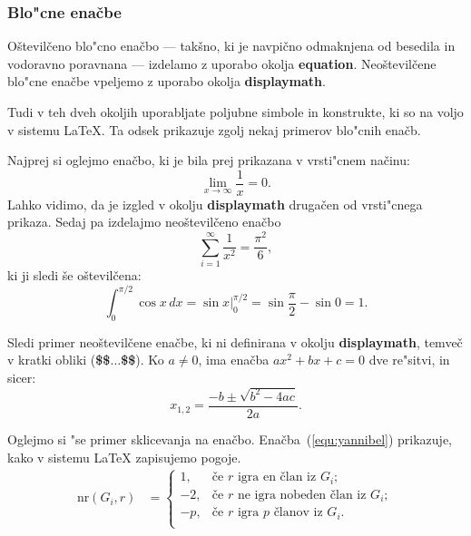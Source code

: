 \documentclass[sigconf]{acmart}
\begin{document}
\subsubsection{Blo"cne enačbe}

Oštevilčeno blo"cno enačbo --- takšno, ki je navpično odmaknjena od besedila
in vodoravno poravnana --- izdelamo z uporabo okolja \textbf{equation}.
Neoštevilčene blo"cne enačbe vpeljemo z uporabo okolja \textbf{displaymath}.

Tudi v teh dveh okoljih uporabljate poljubne simbole in konstrukte, ki so na
voljo v sistemu \LaTeX. Ta odsek prikazuje zgolj nekaj primerov blo"cnih
enačb.

Najprej si oglejmo enačbo, ki je bila prej prikazana v vrsti"cnem načinu: 
%
\begin{equation}
\lim_{x\rightarrow \infty}\frac{1}{x}=0.
\end{equation}
%
Lahko vidimo, da je izgled v okolju \textbf{displaymath} drugačen od vrsti"cnega
prikaza.  Sedaj pa izdelajmo neoštevilčeno enačbo
%
\begin{displaymath}
    \sum_{i=1}^{\infty} \frac{1}{x^2} = \frac{\pi^2}{6},
\end{displaymath}
%
ki ji sledi še oštevilčena:
%
\begin{equation}
    \int_{0}^{\pi/2} \cos x\,dx = \sin x\bigg\rvert_{0}^{\pi/2} = \sin
    \frac{\pi}{2} - \sin 0 = 1.
\end{equation}

Sledi primer neoštevilčene enačbe, ki ni definirana v okolju
\textbf{displaymath}, temveč v kratki obliki (\textbf{\$\$$\ldots$\$\$}).  Ko $a
\ne 0$, ima enačba $ax^2 + bx + c = 0$ dve re"sitvi, in sicer:
%
$$x_{1, 2} = \frac{-b \pm \sqrt{b^2-4ac}}{2a}.$$

Oglejmo si "se primer sklicevanja na enačbo. Enačba~(\ref{equ:yannibel})
prikazuje, kako v sistemu \LaTeX{} zapisujemo pogoje.
%
\begin{equation}
    \begin{aligned} 
        \mathrm{nr}(G_i,r) & = \label{equ:yannibel}
        \begin{cases}
            1,  & \text{če $r$ igra en član iz $G_i$};\\
            -2, & \text{če $r$ ne igra nobeden član iz $G_i$}; \\
            -p, & \text{če $r$ igra $p$ članov iz $G_i$}.\\
        \end{cases}
    \end{aligned}
\end{equation}
\end{document}

